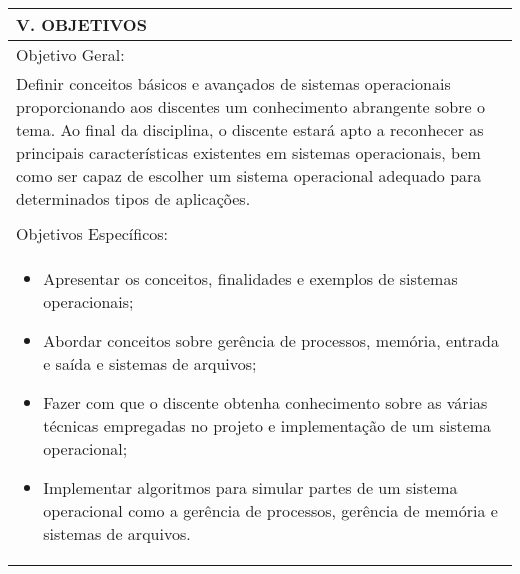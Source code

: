 \documentclass[12pt]{article}
\begin{document}
\begin{longtable}{|L{1.025\textwidth}|} \hline
%
{\bf V. OBJETIVOS } \\ \hline
%
Objetivo Geral:\\

Definir conceitos básicos e avançados de sistemas operacionais proporcionando aos discentes um conhecimento abrangente sobre o tema. Ao final da disciplina, o discente estará apto a reconhecer as principais características existentes em sistemas operacionais, bem como ser capaz de escolher um sistema operacional adequado para determinados tipos de aplicações. \\
\\
Objetivos Específicos:\\
\begin{itemize}
\item Apresentar os conceitos, finalidades e exemplos de sistemas operacionais;
\item Abordar conceitos sobre gerência de processos, memória, entrada e saída e sistemas de arquivos;
\item Fazer com que o discente obtenha conhecimento sobre as várias técnicas empregadas no projeto e implementação de um sistema operacional;
\item Implementar algoritmos para simular partes de um sistema operacional como a gerência de processos, gerência de memória e sistemas de arquivos.
\end{itemize}
\\ \hline
\end{longtable}
\end{document}
